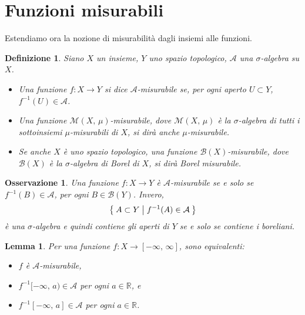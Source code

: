 \documentclass[a4paper,10pt,openright,oneside]{book}
\theoremstyle{theoremstyle}
\newtheorem{lemma}[teorema]{Lemma}
\theoremstyle{theoremstylewoheader}
\theoremstyle{theoremstyle}
\newtheorem{definizione}[teorema]{Definizione}
\newtheorem{osservazione}[teorema]{Osservazione}
\theoremstyle{proofsecstyle}
\theoremstyle{nonumberplain}
\renewcommand{\AA}{\ensuremath{\mathcal{A}}}
\newcommand{\BB}{\ensuremath{\mathcal{B}}}
\newcommand{\MM}{\ensuremath{\mathcal{M}}}
\newcommand{\RR}{\ensuremath{\mathbb{R}}}
\begin{document}
\section{Funzioni misurabili}

Estendiamo ora la nozione di misurabilità dagli insiemi alle funzioni.

\begin{definizione}
\label{def:funzione_misurabile}
Siano $X$ un insieme, $Y$ uno spazio topologico, $\AA$ una $\sigma$-algebra su $X$.
\begin{itemize}
\item[(i)] Una funzione $f : X \rightarrow Y$ si dice \emph{$\AA$-misurabile}\index{funzione!$\AA$-misurabile} se, per ogni aperto $U \subset Y$, $f^{-1} (U) \in \AA$.
\item[(ii)] Una funzione $\MM(X,\, \mu)$-misurabile, dove $\MM(X,\, \mu)$ è la $\sigma$-algebra di tutti i sottoinsiemi $\mu$-misurabili di $X$, si dirà anche \emph{$\mu$-misurabile}.
\item[(iii)] Se anche $X$ è uno spazio topologico, una funzione $\BB(X)$-misurabile, dove $\BB(X)$ è la $\sigma$-algebra di Borel di $X$, si dirà \emph{Borel misurabile}.
\end{itemize}
\end{definizione}

\begin{osservazione}
\label{oss:caratterizzazione_funzioni_misurabili}
Una funzione $f : X \rightarrow Y$ è $\AA$-misurabile se e solo se $f^{-1} (B) \in \AA$, per ogni $B \in \BB(Y)$. Invero,
\[
\Set { A \subset Y | f^{-1} (A) \in \AA } 
\]
è una $\sigma$-algebra e quindi contiene gli aperti di $Y$ se e solo se contiene i boreliani.
\end{osservazione}

\begin{lemma}
\label{lem:caratterizzazione_funzioni_misurabili}
Per una funzione $f : X \rightarrow [-\infty,\, \infty]$, sono equivalenti:
\begin{itemize}
\item[($\alpha$)] $f$ è $\AA$-misurabile,
\item[($\beta$)] $f^{-1}[-\infty,\, a) \in \AA$ per ogni $a \in \RR$, e
\item[($\gamma$)] $f^{-1}[-\infty,\, a] \in \AA$ per ogni $a \in \RR$.
\end{itemize}
\end{lemma}
\end{document}
